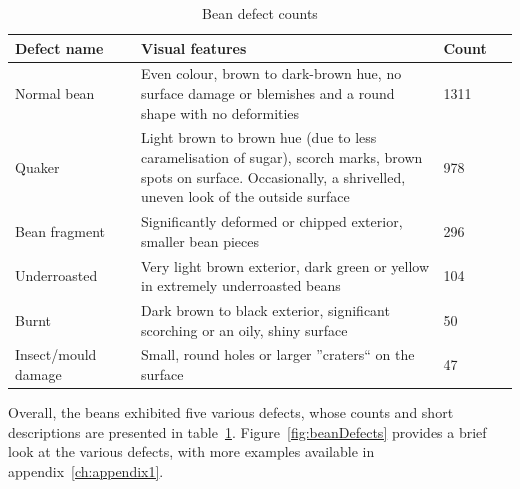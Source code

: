 \begin{table}[h]
    \centering
    \begin{tabular}{|p{0.25\linewidth}|p{0.6\linewidth}|p{0.15\linewidth}|}
        \toprule \textbf{Defect name} & \textbf{Visual features}                                                                                                                                             & \textbf{Count} \\
        \midrule Normal bean          & Even colour, brown to dark-brown hue, no surface damage or blemishes and a round shape with no deformities                                                           & 1311           \\
        Quaker                        & Light brown to brown hue (due to less caramelisation of sugar), scorch marks, brown spots on surface.
        Occasionally, a shrivelled, uneven look of the outside surface & 978            \\
        Bean fragment                 & Significantly deformed or chipped exterior, smaller bean pieces                                                                                                      & 296            \\
        Underroasted                  & Very light brown exterior, dark green or yellow in extremely underroasted beans                                                                                      & 104            \\
        Burnt                         & Dark brown to black exterior, significant scorching or an oily, shiny surface                                                                                        & 50             \\
        Insect/mould damage           & Small, round holes or larger ''craters`` on the surface                                                                                                              & 47             \\
        \bottomrule
    \end{tabular}
    \caption{Bean defect counts}
    \label{tab:beanDefectCounts}
\end{table}
Overall, the beans exhibited five various defects, whose
counts and short descriptions are presented in table~\ref{tab:beanDefectCounts}.
Figure~\ref{fig:beanDefects} provides a brief look at the various defects, with more
examples available in appendix~\ref{ch:appendix1}.

